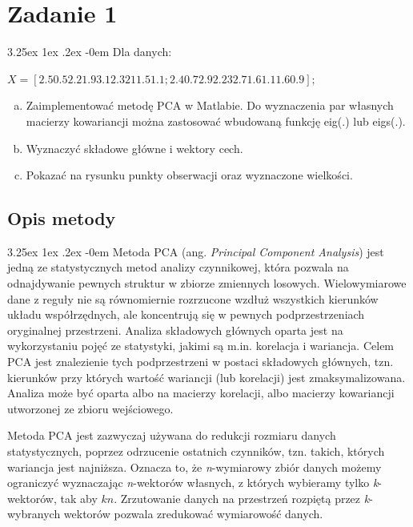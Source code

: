 \documentclass[11pt, a4paper]{article}
\date{\today}
\makeatletter
\newcommand{\fbi}{\leavevmode{\parindent=1em\indent}}
\renewcommand\paragraph{\@startsection{paragraph}{5}{\z@}
  {3.25ex \@plus1ex \@minus.2ex}
  {-0em}
  {\normalfont\normalsize\bfseries}}
\makeatother
\begin{document}


\tableofcontents

\newpage

\section{Zadanie 1}
\paragraph{}
Dla danych:
\begin{center}
\(X = [2.5 0.5 2.2 1.9 3.1 2.3 2 1 1.5 1.1; 2.4 0.7 2.9 2.2 3 2.7 1.6 1.1 1.6 0.9];\)
\end{center}
\begin{enumerate}[a.]
	\item Zaimplementować metodę PCA w Matlabie. Do wyznaczenia par własnych macierzy kowariancji można zastosować wbudowaną funkcję eig(.) lub eigs(.).
	\item Wyznaczyć składowe główne i wektory cech.
	\item Pokazać na rysunku punkty obserwacji oraz wyznaczone wielkości.
\end{enumerate}

\subsection{Opis metody}
\paragraph{}
Metoda PCA (ang. \textit{Principal Component Analysis}) jest jedną ze statystycznych metod analizy czynnikowej, która pozwala na odnajdywanie pewnych struktur w zbiorze zmiennych losowych. Wielowymiarowe dane z reguły nie są równomiernie rozrzucone wzdłuż wszystkich kierunków układu współrzędnych, ale koncentrują się w pewnych podprzestrzeniach oryginalnej przestrzeni. Analiza składowych głównych oparta jest na wykorzystaniu pojęć ze statystyki, jakimi są m.in. korelacja i wariancja. Celem PCA jest znalezienie tych podprzestrzeni w postaci składowych głównych, tzn. kierunków przy których wartość wariancji (lub korelacji) jest zmaksymalizowana. Analiza może być oparta albo na macierzy korelacji, albo macierzy kowariancji utworzonej ze zbioru wejściowego.

\fbi
Metoda PCA jest zazwyczaj używana do redukcji rozmiaru danych statystycznych, poprzez odrzucenie ostatnich czynników, tzn. takich, których wariancja jest najniższa. Oznacza to, że \textit{n}-wymiarowy zbiór danych możemy ograniczyć wyznaczając \textit{n}-wektorów własnych, z których wybieramy tylko \textit{k}-wektorów, tak aby $k  n$. Zrzutowanie danych na przestrzeń rozpiętą przez \textit{k}-wybranych wektorów pozwala zredukować wymiarowość danych.
\end{document}
